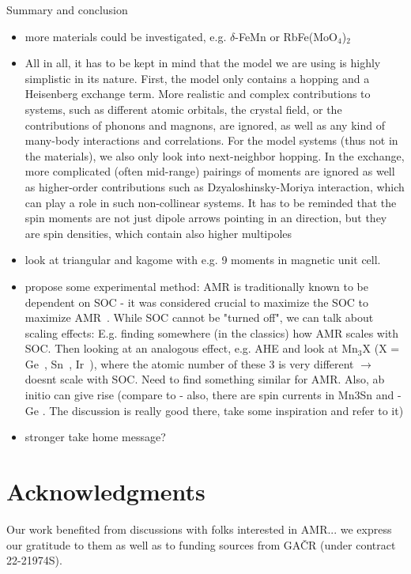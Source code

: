 \documentclass[prb,showpacs,amsmath,amssymb,superscriptaddress,twocolumn,floatfix]{revtex4-1}
\begin{document}
Summary and conclusion

\begin{itemize}
	\item more materials could be investigated, e.g. $\delta$-FeMn
	or RbFe(MoO$_4$)$_2$
	\item All in all, it has to be kept in mind that the model we are using is highly simplistic in its nature. First, the model only contains a hopping and a Heisenberg exchange term. More realistic and complex contributions to systems, such as different atomic orbitals, the crystal field, or the contributions of phonons and magnons, are ignored, as well as any kind of many-body interactions and correlations. For the model systems (thus not in the materials), we also only look into next-neighbor hopping. In the exchange, more complicated (often mid-range) pairings of moments are ignored as well as higher-order contributions such as Dzyaloshinsky-Moriya interaction, which can play a role in such non-collinear systems. It has to be reminded that the spin moments are not just dipole arrows pointing in an direction, but they are spin densities, which contain also higher multipoles
	\item look at triangular and kagome with e.g. 9 moments in magnetic unit cell. 
	\item propose some experimental method: AMR is traditionally known to be dependent on SOC - it was considered crucial to maximize the SOC to maximize AMR~\cite{Ritzinger:2023}. While SOC cannot be "turned off", we can talk about scaling effects: E.g. finding somewhere (in the classics) how AMR scales with SOC. Then looking at an analogous effect, e.g. AHE and look at Mn$_3$X (X = Ge~\cite{Kiyohara:2016}, Sn~\cite{Nakatsuji:2015}, Ir~\cite{Iwaki:2020}), where the atomic number of these 3 is very different $\rightarrow$ doesnt scale with SOC. Need to find something similar for AMR. Also, ab initio can give rise (compare to \cite{Gonzalez-Hernandez:2024} - also, there are spin currents in Mn3Sn and -Ge \cite{Zelezny:2017}. The discussion is really good there, take some inspiration and refer to it)
	
	\item stronger take home message?
\end{itemize}


\section*{Acknowledgments}

Our work benefited from discussions with folks interested in AMR...
we express our gratitude to them as well as to funding sources from GA\v{C}R (under contract 22-21974S).
 
\end{document}
